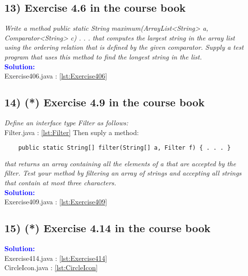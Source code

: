 \documentclass[main.tex]{subfiles}
\begin{document}
\subsection*{13) Exercise 4.6 in the course book}
\textit{Write a method
public static String maximum(ArrayList<String> a, Comparator<String> c) { . . . }
that computes the largest string in the array list using the ordering relation that is defined by the
given comparator. Supply a test program that uses this method to find the longest string in the
list.}\\
\indent \textbf{\textcolor{blue}{Solution:}} \\
Exercise406.java : \ref{lst:Exercise406}

\subsection*{14) (*) Exercise 4.9 in the course book}
\textit{Define an interface type Filter as follows:
}\\
Filter.java : \ref{lst:Filter}
Then suply a method:
\begin{verbatim}
    public static String[] filter(String[] a, Filter f) { . . . }   
\end{verbatim}
\textit{that returns an array containing all the elements of a that are accepted by the filter. Test your
method by filtering an array of strings and accepting all strings that contain at most three characters.
}\\
\indent \textbf{\textcolor{blue}{Solution:}} \\
Exercise409.java : \ref{lst:Exercise409}

\subsection*{15) (*) Exercise 4.14 in the course book}
\indent \textbf{\textcolor{blue}{Solution:}} \\
Exercise414.java : \ref{lst:Exercise414}\\
CircleIcon.java : \ref{lst:CircleIcon}\\
\end{document}
